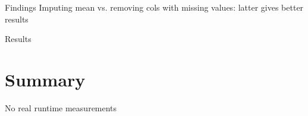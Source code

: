 \documentclass[12pt]{beamer}
\begin{document}
\begin{frame}{Findings}
Imputing mean vs. removing cols with missing values: latter gives better results
\end{frame}

\begin{frame}{Results}
\resizebox{\linewidth}{!}{}
\end{frame}

\section{Summary}
\begin{frame}

No real runtime measurements
\end{frame}
\end{document}
